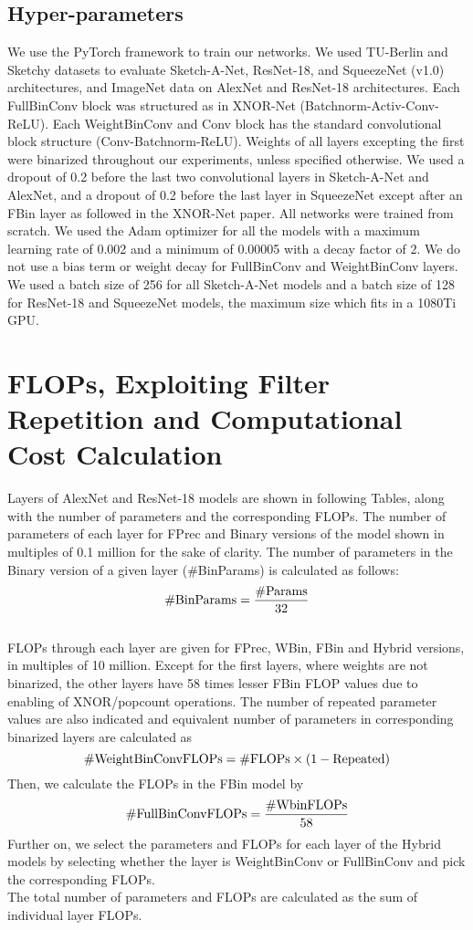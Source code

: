 \documentclass[10pt,twocolumn,letterpaper]{article}
\begin{document}
\subsection{Hyper-parameters} 
We use the PyTorch framework to train our networks. We used TU-Berlin and Sketchy datasets to evaluate Sketch-A-Net, ResNet-18, and SqueezeNet (v1.0) architectures, and ImageNet data on AlexNet and ResNet-18 architectures. Each FullBinConv block was structured as in XNOR-Net (Batchnorm-Activ-Conv-ReLU). Each WeightBinConv and Conv block has the standard convolutional block structure (Conv-Batchnorm-ReLU). Weights of all layers excepting the first were binarized throughout our experiments, unless specified otherwise. We used a dropout of 0.2 before the last two convolutional layers in Sketch-A-Net and AlexNet, and a dropout of 0.2 before the last layer in SqueezeNet except after an FBin layer as followed in the XNOR-Net paper. All networks were trained from scratch. We used the Adam optimizer for all the models with a maximum learning rate of 0.002 and a minimum of 0.00005 with a decay factor of 2.  We do not use a bias term or weight decay for FullBinConv and WeightBinConv layers. We used a batch size of 256 for all Sketch-A-Net models and a batch size of 128 for ResNet-18 and SqueezeNet models, the maximum size which fits in a 1080Ti GPU.\\

\section{FLOPs, Exploiting Filter Repetition and Computational Cost Calculation}
Layers of AlexNet and ResNet-18 models are shown in following Tables, along with the number of parameters and the corresponding FLOPs. The number of parameters of each layer for FPrec and Binary versions of the model shown in multiples of 0.1 million for the sake of clarity. The number of parameters in the Binary version of a given layer (\#BinParams) is calculated as follows: \\
$$ \textnormal{\#BinParams} = \frac{\textnormal{\#Params}}{32}$$\\

FLOPs through each layer are given for FPrec, WBin, FBin and Hybrid versions, in multiples of 10 million. Except for the first layers, where weights are not binarized, the other layers have 58 times lesser FBin FLOP values due to enabling of XNOR/popcount operations. The number of repeated parameter values are also indicated and equivalent number of parameters in corresponding binarized layers are calculated as 
$$ \textnormal{\#WeightBinConvFLOPs} = \textnormal{\#FLOPs} \times (1-\textnormal{Repeated})$$
Then, we calculate the FLOPs in the FBin model by
$$\textnormal{\#FullBinConvFLOPs} = \frac{\textnormal{\#WbinFLOPs}}{58}$$
Further on, we select the parameters and FLOPs for each layer of the Hybrid models by selecting whether the layer is WeightBinConv or FullBinConv and pick the corresponding FLOPs.\\
The total number of parameters and FLOPs are calculated as the sum of individual layer FLOPs.
\end{document}

